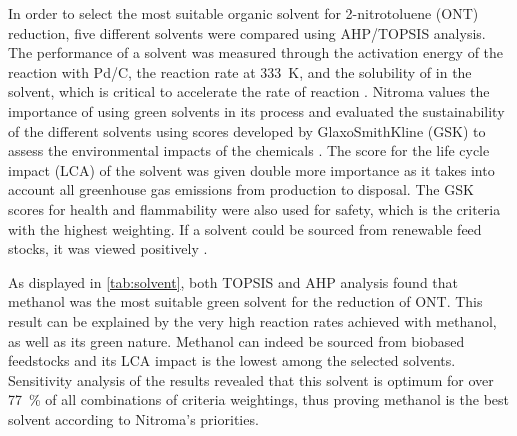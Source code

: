 In order to select the most suitable organic solvent for 2-nitrotoluene (ONT) reduction, five different solvents were compared using AHP/TOPSIS analysis. The performance of a solvent was measured through the activation energy of the reaction with Pd/C, the reaction rate at \SI{333}{\K}, and the solubility of  in the solvent, which is critical to accelerate the rate of reaction \cite{rajadhyaksha_solvent_1986}. Nitroma values the importance of using green solvents in its process and evaluated the sustainability of the different solvents using scores developed by GlaxoSmithKline (GSK) to assess the environmental impacts of the chemicals \cite{henderson_expanding_2011}. The score for the life cycle impact (LCA) of the solvent was given double more importance as it takes into account all greenhouse gas emissions from production to disposal. The GSK scores for health and flammability were also used for safety, which is the criteria with the highest weighting. If a solvent could be sourced from renewable feed stocks, it was viewed positively \cite{byrne_tools_2016}. %

As displayed in \cref{tab:solvent}, both TOPSIS and AHP analysis found that methanol was the most suitable green solvent for the reduction of ONT. This result can be explained by the very high reaction rates achieved with methanol, as well as its green nature. Methanol can indeed be sourced from biobased feedstocks and its LCA impact is the lowest among the selected solvents. Sensitivity analysis of the results revealed that this solvent is optimum for over \SI{77}{\percent} of all combinations of criteria weightings, thus proving methanol is the best solvent according to Nitroma's priorities. 



